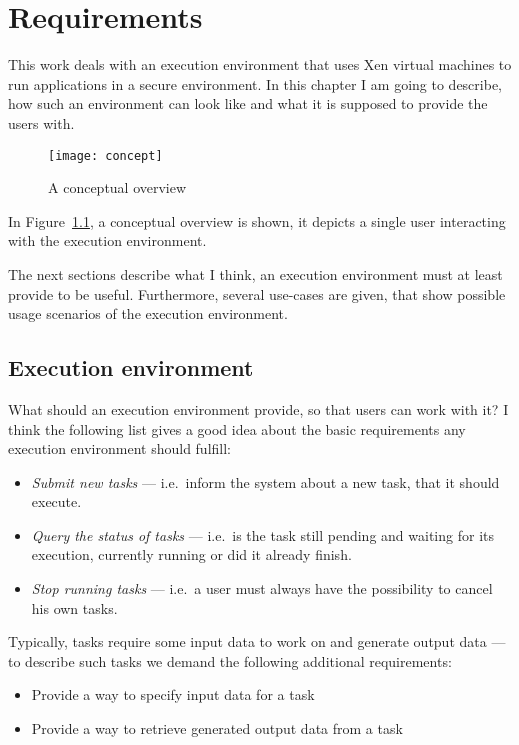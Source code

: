 \chapter{Requirements}
\label{cha:requirements}

This  work deals  with  an  execution environment  that  uses Xen  virtual
machines to run  applications in a secure environment.   In this chapter I
am going to describe, how such an environment can look like and what it is
supposed to provide the users with.

\begin{figure}[htbp]
  \centering
  \texttt{[image: concept]}
  \caption[Conceptual overview]{A conceptual overview}
  \label{fig:concept}
\end{figure}

In Figure~\ref{fig:concept},  a conceptual overview  is shown, it  depicts a
single user interacting with the execution environment.

The next sections describe what  I think, an execution environment must at
least provide to be useful. Furthermore, several use-cases are given, that
show possible usage scenarios of the execution environment.

\section{Execution environment}
\label{sec:req-execution-environment}

What should an execution environment  provide, so that users can work with
it?  I  think  the following  list  gives  a  good  idea about  the  basic
requirements any execution environment should fulfill:

\begin{itemize}
\item \emph{Submit new tasks} --- i.e.~inform the system about a new task,
  that it should execute.
\item \emph{Query the status of  tasks} --- i.e.~is the task still pending
  and  waiting for  its execution,  currently  running or  did it  already
  finish.
\item \emph{Stop running tasks} --- i.e.~a user must always have the
  possibility to cancel his own tasks.
\end{itemize}

Typically, tasks  require some input data  to work on  and generate output
data  ---  to describe  such  tasks  we  demand the  following  additional
requirements:
\begin{itemize}
\item Provide a way to specify input data for a task
\item Provide a way to retrieve generated output data from a task
\end{itemize}

